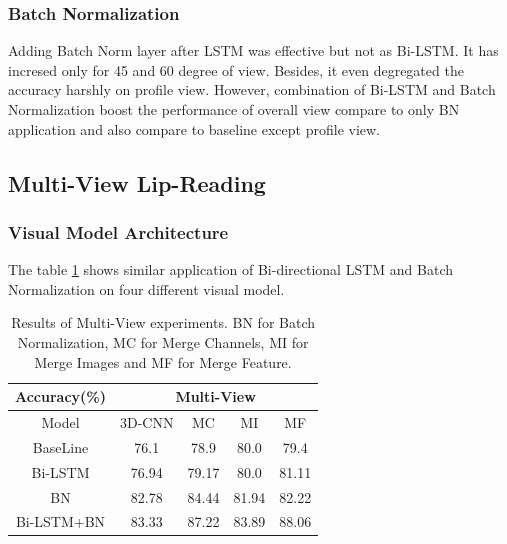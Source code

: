 \subsubsection{Batch Normalization}
Adding Batch Norm layer after LSTM was effective but not as Bi-LSTM. It	has incresed only for 45 and 60 degree of view. Besides, it even degregated the accuracy harshly on profile view. However, combination of Bi-LSTM and Batch Normalization boost the performance of overall view compare to only BN application and also compare to baseline except profile view. 	


\subsection{Multi-View Lip-Reading}
\subsubsection{Visual Model Architecture}
The table \ref{tab:multitb} shows similar application of Bi-directional LSTM and Batch Normalization on four different visual model. 
\begin{table}[h]
\centering
    \begin{tabular}{c|cccc}
        \multicolumn{1}{c|}{Accuracy(\%)} &%
        \multicolumn{4}{c}{Multi-View}\\ \hline
        Model&%
        3D-CNN & MC & MI & MF \\\hline
        BaseLine%
        & %
        76.1 & 78.9& 80.0& 79.4\\
        Bi-LSTM%
        & %
        76.94 & 79.17& 80.0& 81.11\\
        BN%
        & %
         82.78& 84.44& 81.94& 82.22\\
        Bi-LSTM+BN%
        & %
         83.33& 87.22& 83.89& 88.06\\
    \end{tabular}
    \caption{Results of Multi-View experiments. BN for Batch Normalization, MC for Merge Channels, MI for Merge Images and MF for Merge Feature.}
    \label{tab:multitb}
\end{table}



